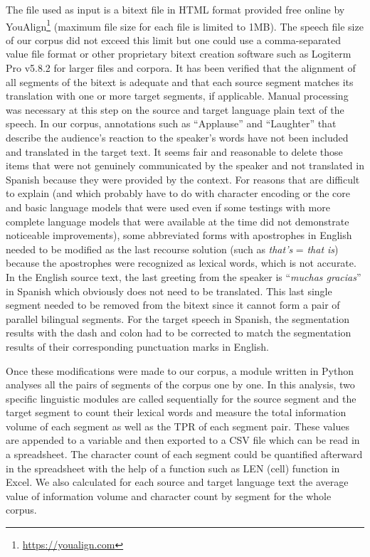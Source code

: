 \documentclass[output=paper]{langsci/langscibook}
\begin{document}
The file used as input is a bitext file in HTML format provided free online by YouAlign\footnote{\url{https://youalign.com}} (maximum file size for each file is limited to 1MB). The speech file size of our corpus did not exceed this limit but one could use a comma-separated value file format or other proprietary bitext creation software such as Logiterm Pro v5.8.2 for larger files and corpora. It has been verified that the alignment of all segments of the bitext is adequate and that each source segment matches its translation with one or more target segments, if applicable. Manual processing was necessary at this step on the source and target language plain text of the speech. In our corpus, annotations such as \enquote{Applause} and \enquote{Laughter} that describe the audience's reaction to the speaker's words have not been included and translated in the target text. It seems fair and reasonable to delete those items that were not genuinely communicated by the speaker and not translated in Spanish because they were provided by the context. For reasons that are difficult to explain (and which probably have to do with character encoding or the core and basic language models that were used even if some testings with more complete language models that were available at the time did not demonstrate noticeable improvements), some abbreviated forms with apostrophes in English needed to be modified as the last recourse solution (such as \textit{that's} = \textit{that is}) because the apostrophes were recognized as lexical words, which is not accurate. In the English source text, the last greeting from the speaker is \enquote{\itshape muchas gracias} in Spanish which obviously does not need to be translated. This last single segment needed to be removed from the bitext since it cannot form a pair of parallel bilingual segments. For the target speech in Spanish, the segmentation results with the dash and colon had to be corrected to match the segmentation results of their corresponding punctuation marks in English.

Once these modifications were made to our corpus, a module written in Python analyses all the pairs of segments of the corpus one by one. In this analysis, two specific linguistic modules are called sequentially for the source segment and the target segment to count their lexical words and measure the total information volume of each segment as well as the TPR of each segment pair. These values are appended to a variable and then exported to a CSV file which can be read in a spreadsheet. The character count of each segment could be quantified afterward in the spreadsheet with the help of a function such as LEN (cell) function in Excel. We also calculated for each source and target language text the average value of information volume and character count by segment for the whole corpus.
\end{document}
